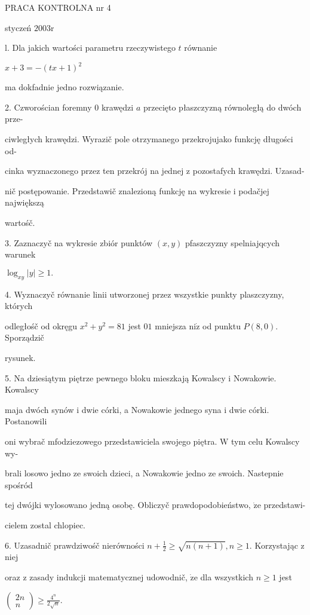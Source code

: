 \documentclass[a4paper,12pt]{article}
\begin{document}
PRACA KONTROLNA nr 4

styczeń $2003\mathrm{r}$

l. Dla jakich wartości parametru rzeczywistego $t$ równanie

$x+3=-(tx+1)^{2}$

ma dokfadnie jedno rozwiązanie.

2. Czworościan foremny $0$ krawędzi $a$ przecięto płaszczyzną równoległą do dwóch prze-

ciwległych krawędzi. Wyrazič pole otrzymanego przekrojujako funkcję długości od-

cinka wyznaczonego przez ten przekrój na jednej $\mathrm{z}$ pozostafych krawędzi. Uzasad-

nič postępowanie. Przedstawič znalezioną funkcję na wykresie $\mathrm{i}$ podačjej największą

wartośč.

3. Zaznaczyč na wykresie zbiór punktów $(x,y)$ pfaszczyzny spelniajqcych warunek

$\log_{xy}|y|\geq 1.$

4. Wyznaczyč równanie linii utworzonej przez wszystkie punkty plaszczyzny, których

odległośč od okręgu $x^{2}+y^{2}=81$ jest $01$ mniejsza $\mathrm{n}\mathrm{i}\dot{\mathrm{z}}$ od punktu $P(8,0)$. Sporządzič

rysunek.

5. Na dziesiątym piętrze pewnego bloku mieszkają Kowalscy $\mathrm{i}$ Nowakowie. Kowalscy

maja dwóch synów $\mathrm{i}$ dwie córki, a Nowakowie jednego syna $\mathrm{i}$ dwie córki. Postanowili

oni wybrač mfodziezowego przedstawiciela swojego piętra. $\mathrm{W}$ tym celu Kowalscy wy-

brali losowo jedno ze swoich dzieci, a Nowakowie jedno ze swoich. Nastepnie spośród

tej dwójki wylosowano jedną osobę. Obliczyč prawdopodobieństwo, $\dot{\mathrm{z}}\mathrm{e}$ przedstawi-

cielem zostal chlopiec.

6. Uzasadnič prawdziwośč nierówności $n+\displaystyle \frac{1}{2}\geq\sqrt{n(n+1)}, n\geq 1$. Korzystając $\mathrm{z}$ niej

oraz $\mathrm{z}$ zasady indukcji matematycznej udowodnič, $\dot{\mathrm{z}}\mathrm{e}$ dla wszystkich $n\geq 1$ jest

$\displaystyle \left(\begin{array}{l}
2n\\
n
\end{array}\right)\geq\frac{4^{n}}{2\sqrt{n}}.$
\end{document}
